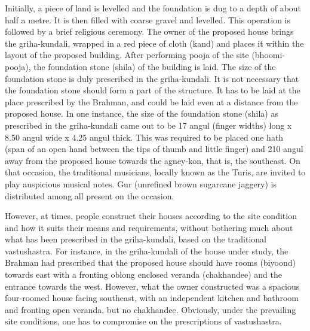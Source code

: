 Initially, a piece of land is levelled and the foundation is dug to a depth of about half a metre. It is then filled with coarse gravel and levelled. This operation is followed by a brief religious ceremony. The owner of the proposed house brings the griha-kundali, wrapped in a red piece of cloth (kand) and places it within the layout of the proposed building. After performing pooja of the site (bhoomi-pooja), the foundation stone (shila) of the building is laid. The size of the foundation stone is duly prescribed in the griha-kundali. It is not necessary that the foundation stone should form a part of the structure. It has to be laid at the place prescribed by the Brahman, and could be laid even at a distance from the proposed house. In one instance, the size of the foundation stone (shila) as prescribed in the griha-kundali came out to be 17 angul (finger widths) long x 8.50 angul wide x 4.25 angul thick. This was required to be placed one hath (span of an open hand between the tips of thumb and little finger) and 210 angul away from the proposed house towards the agney-kon, that is, the southeast. On that occasion, the traditional musicians, locally known as the Turis, are invited to play auspicious musical notes. Gur (unrefined brown sugarcane jaggery) is distributed among all present on the occasion.

However, at times, people construct their houses according to the site condition and how it suits their means and requirements, without bothering much about what has been prescribed in the griha-kundali, based on the traditional vastushastra. For instance, in the griha-kundali of the house under study, the Brahman had prescribed that the proposed house should have rooms (biyoond) towards east with a fronting oblong enclosed veranda (chakhandee) and the entrance towards the west. However, what the owner constructed was a spacious four-roomed house facing southeast, with an independent kitchen and bathroom and fronting open veranda, but no chakhandee. Obviously, under the prevailing site conditions, one has to compromise on the prescriptions of vastushastra.

